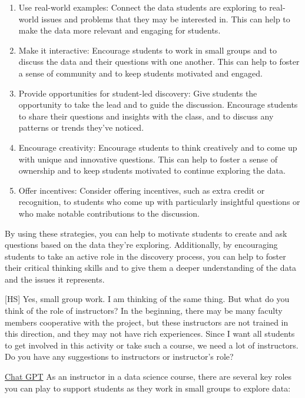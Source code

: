 \documentclass[
]{bxjsbook}
\providecommand{\tightlist}{%
  \setlength{\itemsep}{0pt}\setlength{\parskip}{0pt}}
\theoremstyle{definition}
\theoremstyle{definition}
\theoremstyle{definition}
\theoremstyle{definition}
\theoremstyle{remark}
\begin{document}
\begin{enumerate}
\def\labelenumi{\arabic{enumi}.}
\tightlist
\item
  Use real-world examples: Connect the data students are exploring to real-world issues and problems that they may be interested in. This can help to make the data more relevant and engaging for students.
\item
  Make it interactive: Encourage students to work in small groups and to discuss the data and their questions with one another. This can help to foster a sense of community and to keep students motivated and engaged.
\item
  Provide opportunities for student-led discovery: Give students the opportunity to take the lead and to guide the discussion. Encourage students to share their questions and insights with the class, and to discuss any patterns or trends they've noticed.
\item
  Encourage creativity: Encourage students to think creatively and to come up with unique and innovative questions. This can help to foster a sense of ownership and to keep students motivated to continue exploring the data.
\item
  Offer incentives: Consider offering incentives, such as extra credit or recognition, to students who come up with particularly insightful questions or who make notable contributions to the discussion.
\end{enumerate}

By using these strategies, you can help to motivate students to create and ask questions based on the data they're exploring. Additionally, by encouraging students to take an active role in the discovery process, you can help to foster their critical thinking skills and to give them a deeper understanding of the data and the issues it represents.

{[}HS{]} Yes, small group work. I am thinking of the same thing. But what do you think of the role of instructors? In the beginning, there may be many faculty members cooperative with the project, but these instructors are not trained in this direction, and they may not have rich experiences. Since I want all students to get involved in this activity or take such a course, we need a lot of instructors. Do you have any suggestions to instructors or instructor's role?

\protect\hyperlink{chatgpt}{Chat GPT} As an instructor in a data science course, there are several key roles you can play to support students as they work in small groups to explore data:
\end{document}

